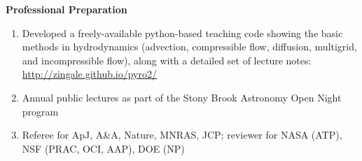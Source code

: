 \documentclass[11pt,letterpaper,english]{article}
\begin{document}
\begin{flushleft} {\bf Professional Preparation}
\begin{enumerate}
\item Developed a freely-available python-based teaching code showing
  the basic methods in hydrodynamics (advection, compressible flow, 
  diffusion, multigrid, and incompressible flow), along with a detailed
  set of lecture notes: \url{http://zingale.github.io/pyro2/} \\ 
\item Annual public lectures as part of the Stony Brook Astronomy Open Night program
 \\
 
\item Referee for ApJ, A\&A, Nature, MNRAS, JCP; reviewer for NASA (ATP), NSF (PRAC, OCI, AAP), DOE (NP) \\ 
\end{enumerate} 


\end{flushleft}
\end{document}
